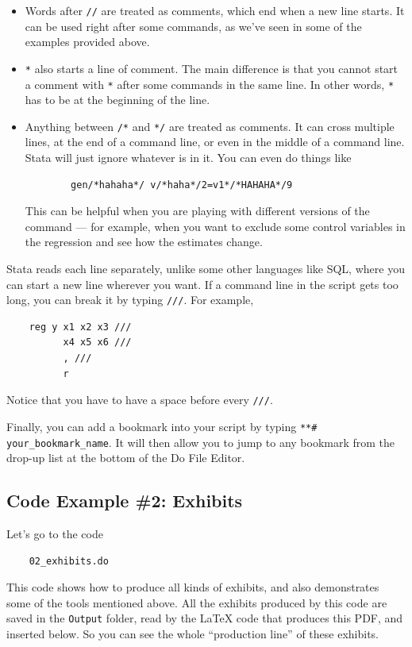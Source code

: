 \begin{itemize}
    \item Words after \verb|//| are treated as comments, which end when a new line starts. It can be used right after some commands, as we've seen in some of the examples provided above. 
    \item \verb|*| also starts a line of comment. The main difference is that you cannot start a comment with \verb|*| after some commands in the same line. In other words, \verb|*| has to be at the beginning of the line. 
    \item Anything between \verb|/*| and \verb|*/| are treated as comments. It can cross multiple lines, at the end of a command line, or even in the middle of a command line. Stata will just ignore whatever is in it. You can even do things like
    \begin{verbatim}
        gen/*hahaha*/ v/*haha*/2=v1*/*HAHAHA*/9
    \end{verbatim}
    This can be helpful when you are playing with different versions of the command --- for example, when you want to exclude some control variables in the regression and see how the estimates change.     
\end{itemize}

Stata reads each line separately, unlike some other languages like SQL, where you can start a new line wherever you want. If a command line in the script gets too long, you can break it by typing \verb|///|. For example, 
\begin{verbatim}
    reg y x1 x2 x3 ///
          x4 x5 x6 ///
          , ///
          r
\end{verbatim}
Notice that you have to have a space before every \verb|///|. 

Finally, you can add a bookmark into your script by typing \verb|**# your_bookmark_name|. It will then allow you to jump to any bookmark from the drop-up list at the bottom of the Do File Editor. 

\subsection{Code Example \#2: Exhibits}
Let's go to the code
\begin{verbatim}
    02_exhibits.do
\end{verbatim}
This code shows how to produce all kinds of exhibits, and also demonstrates some of the tools mentioned above. All the exhibits produced by this code are saved in the \verb|Output| folder, read by the {\LaTeX} code that produces this PDF, and inserted below. So you can see the whole ``production line'' of these exhibits. 

